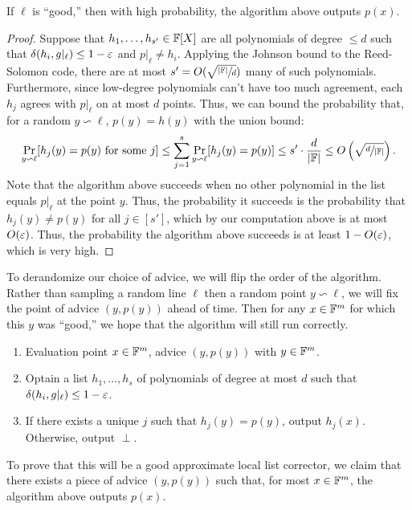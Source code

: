 \documentclass[11pt]{article}
\begin{document}
\begin{claim}{2.6}
    If $\ell$ is ``good,'' then with high probability, the algorithm above outputs $p(x)$.
\end{claim}
\begin{proof}
    Suppose that $h_1, \ldots, h_{s'} \in \mathbb{F}[X]$ are all polynomials of degree $\leq d$ such that $\delta(h_i, g|_\ell) \leq 1 - \varepsilon$ and $p|_\ell \neq h_i$. Applying the Johnson bound to the Reed-Solomon code, there are at most $s' = O(\sqrt{\sfrac{|\mathbb{F}|}{d}})$ many of such polynomials. Furthermore, since low-degree polynomials can't have too much agreement, each $h_j$ agrees with $p|_\ell$ on at most $d$ points. Thus, we can bound the probability that, for a random $y \backsim \ell$, $p(y) = h(y)$ with the union bound:
    \begin{equation*}
        \Pr_{y \backsim \ell}[h_j(y) = p(y) \text{ for some $j$}] \leq \sum_{j = 1}^{s}\Pr_{y \backsim \ell}[h_j(y) = p(y)] \leq s' \cdot \frac{d}{|\mathbb{F}|} \leq O\left(\sqrt{\sfrac{d}{|\mathbb{F}|}}\right).
    \end{equation*}
    Note that the algorithm above succeeds when no other polynomial in the list equals $p|_\ell$ at the point $y$. Thus, the probability it succeeds is the probability that $h_j(y) \neq p(y)$ for all $j \in [s']$, which by our computation above is at most $O(\varepsilon)$. Thus, the probability the algorithm above succeeds is at least $1 - O(\varepsilon)$, which is very high.
\end{proof}
To derandomize our choice of advice, we will flip the order of the algorithm. Rather than sampling a random line $\ell$ then a random point $y \backsim \ell$, we will fix the point of advice $(y, p(y))$ ahead of time. Then for any $x \in \mathbb{F}^m$ for which this $y$ was ``good,'' we hope that the algorithm will still run correctly.
\begin{enumerate}
    \item[Input:] Evaluation point $x \in \mathbb{F}^m$, advice $(y, p(y))$ with $y \in \mathbb{F}^m$.
    \item[$\rightarrow$ 1:] Optain a list $h_1, \ldots, h_s$ of polynomials of degree at most $d$ such that $\delta(h_i, g |_\ell) \leq 1 - \varepsilon$.
    \item[$\rightarrow$ 2:] If there exists a unique $j$ such that $h_j(y) = p(y)$, output $h_j(x)$. Otherwise, output $\perp$.
\end{enumerate}

To prove that this will be a good approximate local list corrector, we claim that there exists a piece of advice $(y, p(y))$ such that, for most $x \in \mathbb{F}^m$, the algorithm above outputs $p(x)$.
\end{document}
